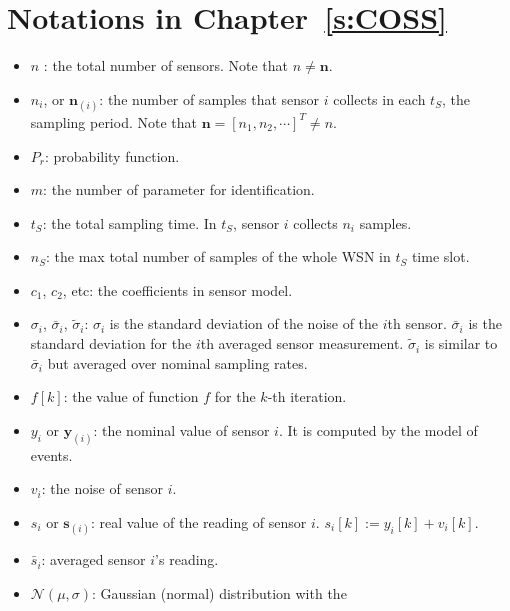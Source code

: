 \section{Notations in Chapter~\ref{s:COSS}}
\begin{itemize}
\item $n$ : the total number of sensors. Note that $n\neq \mathbf{n}$.
\item $n_i$, or $\mathbf{n}_{(i)}$: the number of samples that sensor $i$ collects in each $t_S$, the sampling period. Note that $\mathbf{n}=[n_1, n_2,\cdots]^T\neq n$. %
\item $P_r$: probability function.
\item $m$: the number of parameter for identification.
\item $t_S$: the total sampling time. In $t_S$, sensor $i$ collects
$n_i$ samples.
\item $n_{S}$: the max total number of samples of the whole WSN in $t_S$ time slot.
\item $c_{1}$, $c_2$, etc: the coefficients in sensor model.
\item $\sigma_{i}$, $\bar{\sigma}_{i}$, $\tilde{\sigma}_i$: $\sigma_{i}$ is the standard deviation of the noise of the $i$th sensor. $\bar{\sigma}_{i}$ is the standard deviation for the $i$th averaged sensor measurement. $\tilde{\sigma}_i$ is similar to $\bar{\sigma}_{i}$ but averaged over nominal sampling rates.
\item $f[k]$: the value of function $f$ for the $k$-th iteration.
\item $y_i$ or $\mathbf{y}_{(i)}$: the nominal value of sensor $i$. It is computed by the model of events.
\item $v_{i}$: the noise of sensor $i$.
\item $s_i$ or $\mathbf{s}_{(i)}$: real value of the reading of sensor $i$. $s_{i}[k]:=y_{i}[k]+v_{i}[k]$.
\item $\bar{s}_{i}$: averaged sensor $i$'s reading.
\item $\mathcal{N}(\mu,\sigma)$: Gaussian (normal) distribution with the

\end{itemize}

